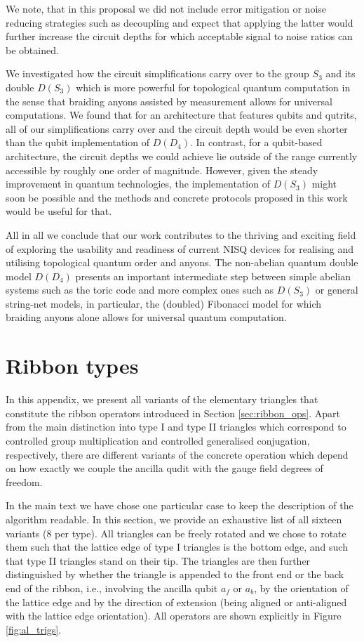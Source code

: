 \documentclass[a4paper,twocolumn,11pt]{quantumarticle}
\begin{document}
We note, that in this proposal we did not include error mitigation or noise reducing strategies such as decoupling and expect that applying the latter would further increase the circuit depths for which acceptable signal to noise ratios can be obtained.


We investigated how the circuit simplifications carry over to the group $S_3$ and its double $D(S_3)$ which is more powerful for topological quantum computation in the sense that braiding anyons assisted by measurement allows for universal computations.
We found that for an architecture that features qubits and qutrits, all of our simplifications carry over and the circuit depth would be even shorter than the qubit implementation of $D(D_4)$. In contrast, for a qubit-based architecture, the circuit depths we could achieve lie outside of the range currently accessible by roughly one order of magnitude. However, given the steady improvement in quantum technologies, the implementation of $D(S_3)$ might soon be possible and the methods and concrete protocols proposed in this work would be useful for that.


All in all we conclude that our work contributes to the thriving and exciting field of exploring the usability and readiness of current NISQ devices for realising and utilising topological quantum order and anyons. The non-abelian quantum double model $D(D_4)$ presents an important intermediate step between simple abelian systems such as the toric code and more complex ones such as $D(S_3)$ or general string-net models, in particular, the (doubled) Fibonacci model for which braiding anyons alone allows for universal quantum computation. 

\FloatBarrier
\onecolumn
\appendix

\section{Ribbon types}\label{app:ribs}


In this appendix, we present all variants of the elementary triangles that constitute the ribbon operators introduced in Section \ref{sec:ribbon_ops}. Apart from the main distinction into type I and type II triangles which correspond to controlled group multiplication and controlled generalised conjugation, respectively, there are different variants of the concrete operation which depend on how exactly we couple the ancilla qudit with the gauge field degrees of freedom.

In the main text we have chose one particular case to keep the description of the algorithm readable. In this section, we provide an exhaustive list of all sixteen variants (8 per type). All triangles can be freely rotated and we chose to rotate them such that the lattice edge of type I triangles is the bottom edge, and such that type II triangles stand on their tip. The triangles are then further distinguished by whether the triangle is appended to the front end or the back end of the ribbon, i.e., involving the ancilla qubit $a_f$ or $a_b$, by the orientation of the lattice edge and by the direction of extension (being aligned or anti-aligned with the lattice edge orientation). All operators are shown explicitly in Figure \ref{fig:al_trigs}. 
\end{document}
